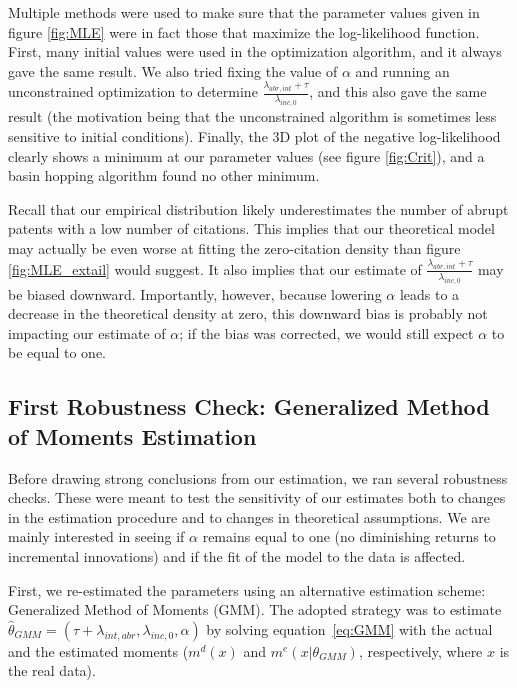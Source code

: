 \documentclass[letterpaper,12pt]{article}
\theoremstyle{definition}
\begin{document}
Multiple methods were used to make sure that the parameter values given in figure \ref{fig:MLE} were in fact those that maximize the log-likelihood function. First, many initial values were used in the optimization algorithm, and it always gave the same result. We also tried fixing the value of $\alpha$ and running an unconstrained optimization to determine $\frac{\lambda_{abr, int} + \tau}{\lambda_{inc,0}}$, and this also gave the same result (the motivation being that the unconstrained algorithm is sometimes less sensitive to initial conditions). Finally, the 3D plot of the negative log-likelihood clearly shows a minimum at our parameter values (see figure \ref{fig:Crit}), and a basin hopping algorithm found no other minimum.

Recall that our empirical distribution likely underestimates the number of abrupt patents with a low number of citations. This implies that our theoretical model may actually be even worse at fitting the zero-citation density than figure \ref{fig:MLE_extail} would suggest. It also implies that our estimate of $\frac{\lambda_{abr, int} + \tau}{\lambda_{inc,0}}$ may be biased downward. Importantly, however, because lowering $\alpha$ leads to a decrease in the theoretical density at zero, this downward bias is probably not impacting our estimate of $\alpha$; if the bias was corrected, we would still expect $\alpha$ to be equal to one.

\subsection{First Robustness Check: Generalized Method of Moments Estimation}

Before drawing strong conclusions from our estimation, we ran several robustness checks. These were meant to test the sensitivity of our estimates both to changes in the estimation procedure and to changes in theoretical assumptions. We are mainly interested in seeing if $\alpha$ remains equal to one (no diminishing returns to incremental innovations) and if the fit of the model to the data is affected.

First, we re-estimated the parameters using an alternative estimation scheme: Generalized Method of Moments (GMM). The adopted strategy was to estimate $\hat{\theta}_{GMM} = (\tau + \lambda_{int,abr}, \lambda_{inc,0}, \alpha)$ by solving equation~\eqref{eq:GMM} with the actual and the estimated moments ($m^d(x)$ and $m^e(x|\theta_{GMM})$, respectively, where $x$ is the real data).
\end{document}
